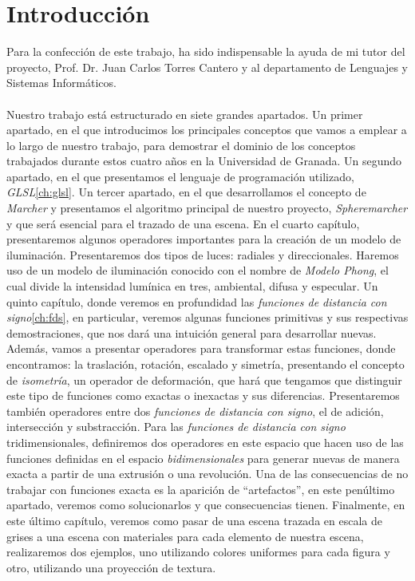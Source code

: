 \chapter*{Introducción}
Para la confección de este trabajo, ha sido indispensable la ayuda de mi tutor del proyecto, Prof. Dr. Juan Carlos Torres Cantero y al departamento de Lenguajes y Sistemas Informáticos.\\\\
Nuestro trabajo está estructurado en siete grandes apartados. Un primer apartado, en el que introducimos los principales conceptos que vamos a emplear a lo largo de nuestro trabajo, para demostrar el dominio de los conceptos trabajados durante estos cuatro años en la Universidad de Granada. Un segundo apartado, en el que presentamos el lenguaje de programación utilizado, \textit{GLSL}\ref{ch:glsl}. Un tercer apartado, en el que desarrollamos el concepto de \textit{Marcher} y presentamos el algoritmo principal de nuestro proyecto, \textit{Spheremarcher} y que será esencial para el trazado de una escena. En el cuarto capítulo, presentaremos algunos operadores importantes para la creación de un modelo de iluminación. Presentaremos dos tipos de luces: radiales y direccionales. Haremos uso de un modelo de iluminación conocido con el nombre de \textit{Modelo Phong}, el cual divide la intensidad lumínica en tres, ambiental, difusa y especular. Un quinto capítulo, donde veremos en profundidad las \textit{funciones de distancia con signo}\ref{ch:fds}, en particular, veremos algunas funciones primitivas y sus respectivas demostraciones, que nos dará una intuición general para desarrollar nuevas. Además, vamos a presentar operadores para transformar estas funciones, donde encontramos: la traslación, rotación, escalado y simetría, presentando el concepto de \textit{isometría}, un operador de deformación, que hará que tengamos que distinguir este tipo de funciones como exactas o inexactas y sus diferencias. Presentaremos también operadores entre dos \textit{funciones de distancia con signo}, el de adición, intersección y substracción. Para las \textit{funciones de distancia con signo} tridimensionales, definiremos dos operadores en este espacio que hacen uso de las funciones definidas en el espacio \textit{bidimensionales} para generar nuevas de manera exacta a partir de una extrusión o una revolución.
Una de las consecuencias de no trabajar con funciones exacta es la aparición de \enquote{artefactos}, en este penúltimo apartado, veremos como solucionarlos y que consecuencias tienen. Finalmente, en este último capítulo, veremos como pasar de una escena trazada en escala de grises a una escena con materiales para cada elemento de nuestra escena, realizaremos dos ejemplos, uno utilizando colores uniformes para cada figura y otro, utilizando una proyección de textura.\\\\
